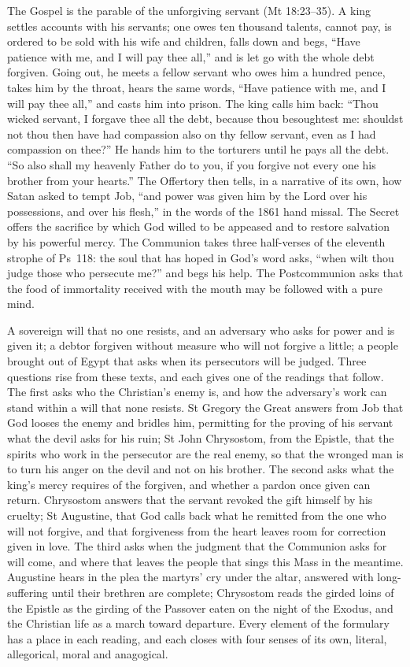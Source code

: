 The Gospel is the parable of the unforgiving servant (Mt 18:23--35). A king
settles accounts with his servants; one owes ten thousand talents, cannot pay,
is ordered to be sold with his wife and children, falls down and begs, ``Have
patience with me, and I will pay thee all,'' and is let go with the whole debt
forgiven. Going out, he meets a fellow servant who owes him a hundred pence,
takes him by the throat, hears the same words, ``Have patience with me, and I
will pay thee all,'' and casts him into prison. The king calls him back: ``Thou
wicked servant, I forgave thee all the debt, because thou besoughtest me:
shouldst not thou then have had compassion also on thy fellow servant, even as
I had compassion on thee?'' He hands him to the torturers until he pays all the
debt. ``So also shall my heavenly Father do to you, if you forgive not every one
his brother from your hearts.'' The Offertory then tells, in a narrative of its
own, how Satan asked to tempt Job, ``and power was given him by the Lord over his
possessions, and over his flesh,'' in the words of the 1861 hand missal. The
Secret offers the sacrifice by which God willed to be appeased and to restore
salvation by his powerful mercy. The Communion takes three half-verses of the
eleventh strophe of Ps~118: the soul that has hoped in God's word asks, ``when
wilt thou judge those who persecute me?'' and begs his help. The Postcommunion
asks that the food of immortality received with the mouth may be followed with
a pure mind.

A sovereign will that no one resists, and an adversary who asks for power and
is given it; a debtor forgiven without measure who will not forgive a little;
a people brought out of Egypt that asks when its persecutors will be judged.
Three questions rise from these texts, and each gives one of the readings that
follow. The first asks who the Christian's enemy is, and how the adversary's
work can stand within a will that none resists. St Gregory the Great answers
from Job that God looses the enemy and bridles him, permitting for the proving
of his servant what the devil asks for his ruin; St John Chrysostom, from the
Epistle, that the spirits who work in the persecutor are the real enemy, so that
the wronged man is to turn his anger on the devil and not on his brother. The
second asks what the king's mercy requires of the forgiven, and whether a pardon
once given can return. Chrysostom answers that the servant revoked the gift
himself by his cruelty; St Augustine, that God calls back what he remitted from
the one who will not forgive, and that forgiveness from the heart leaves room
for correction given in love. The third asks when the judgment that the
Communion asks for will come, and where that leaves the people that sings this
Mass in the meantime. Augustine hears in the plea the martyrs' cry under the
altar, answered with long-suffering until their brethren are complete;
Chrysostom reads the girded loins of the Epistle as the girding of the Passover
eaten on the night of the Exodus, and the Christian life as a march toward
departure. Every element of the formulary has a place in each reading, and each
closes with four senses of its own, literal, allegorical, moral and anagogical.

